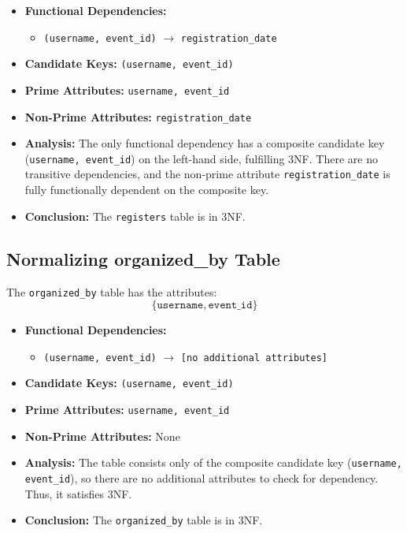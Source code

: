 \begin{itemize}
    \item \textbf{Functional Dependencies:}
    \begin{itemize}
        \item \texttt{(username, event\_id)} $\rightarrow$ \texttt{registration\_date}
    \end{itemize}

    \item \textbf{Candidate Keys:} \texttt{(username, event\_id)}

    \item \textbf{Prime Attributes:} \texttt{username, event\_id}

    \item \textbf{Non-Prime Attributes:} \texttt{registration\_date}

    \item \textbf{Analysis:} The only functional dependency has a composite candidate key (\texttt{username, event\_id}) on the left-hand side, fulfilling 3NF. There are no transitive dependencies, and the non-prime attribute \texttt{registration\_date} is fully functionally dependent on the composite key.

    \item \textbf{Conclusion:} The \texttt{registers} table is in 3NF.
\end{itemize}

\subsection{Normalizing organized\_by Table}

The \texttt{organized\_by} table has the attributes:
\[
\{ \texttt{username}, \texttt{event\_id} \}
\]

\begin{itemize}
    \item \textbf{Functional Dependencies:}
    \begin{itemize}
        \item \texttt{(username, event\_id)} $\rightarrow$ \texttt{[no additional attributes]}
    \end{itemize}

    \item \textbf{Candidate Keys:} \texttt{(username, event\_id)}

    \item \textbf{Prime Attributes:} \texttt{username, event\_id}

    \item \textbf{Non-Prime Attributes:} None

    \item \textbf{Analysis:} The table consists only of the composite candidate key (\texttt{username, event\_id}), so there are no additional attributes to check for dependency. Thus, it satisfies 3NF.

    \item \textbf{Conclusion:} The \texttt{organized\_by} table is in 3NF.
\end{itemize}

